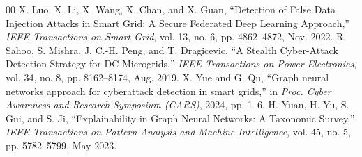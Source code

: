 \documentclass[conference]{IEEEtran}
\begin{document}
\begin{thebibliography}{00}
 X. Luo, X. Li, X. Wang, X. Chan, and X. Guan, ``Detection of False Data Injection Attacks in Smart Grid: A Secure Federated Deep Learning Approach,'' \emph{IEEE Transactions on Smart Grid}, vol. 13, no. 6, pp. 4862--4872, Nov. 2022.
 R. Sahoo, S. Mishra, J. C.-H. Peng, and T. Dragicevic, ``A Stealth Cyber-Attack Detection Strategy for DC Microgrids,'' \emph{IEEE Transactions on Power Electronics}, vol. 34, no. 8, pp. 8162--8174, Aug. 2019.
 X. Yue and G. Qu, ``Graph neural networks approach for cyberattack detection in smart grids,'' in \emph{Proc. Cyber Awareness and Research Symposium (CARS)}, 2024, pp. 1--6.
 H. Yuan, H. Yu, S. Gui, and S. Ji, ``Explainability in Graph Neural Networks: A Taxonomic Survey,'' \emph{IEEE Transactions on Pattern Analysis and Machine Intelligence}, vol. 45, no. 5, pp. 5782--5799, May 2023.
\end{thebibliography}
\end{document}
